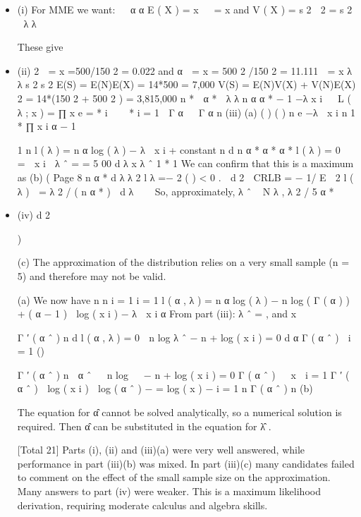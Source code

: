 \documentclass[a4paper,12pt]{article}
\begin{document}
\begin{itemize}
\item (i)
For MME we want:


α
α
E ( X ) = x   = x and V ( X ) = s 2  2 = s 2

λ
λ

These give
\item (ii)
2
 = x =500/150 2 = 0.022 and α
 = x = 500 2 /150 2 = 11.111
 = x λ
λ
s 2
s 2 
E(S) = E(N)E(X) = 14*500 = 7,000 
V(S) = E(N)V(X) + V(N)E(X) 2 = 14*(150 2 + 500 2 ) = 3,815,000 
n
*
 α *

λ
λ n α
α * − 1 −λ x i 

L ( λ ; x ) = ∏
x
e
=
* i

 
*
i = 1  Γ α

 Γ α
n
(iii)
(a)
( )
{ ( ) }
n
e
−λ  x i n
1
*
∏ x i α − 1

1
n
l ( λ ) = n α log ( λ ) − λ  x i + constant 
n
d
n α *
α * α *
l ( λ ) = 0 
=  x i  λ ˆ =
=
5 00
d λ
x
λ ˆ
1 
*
1
We can confirm that this is a maximum as
(b)
(
Page 8
n α *
d λ λ 2
l λ =−
2 ( )
< 0 .
 d 2

CRLB = − 1/ E  2 l ( λ )  = λ 2 / ( n α * )
 d λ



So, approximately, λ ˆ ~ N λ , λ 2 / 5 α *
\item (iv)
d 2


)

(c) The approximation of the distribution relies on a very small sample
(n = 5) and therefore may not be valid.

(a) We now have
n n
i = 1 i = 1
l ( α , λ ) = n α log ( λ ) − n log ( Γ ( α ) ) + ( α − 1 )  log ( x i ) − λ  x i 
α
From part (iii): λ ˆ = , and
x 

Γ ′ ( α ˆ ) n
d
l ( α , λ ) = 0  n log λ ˆ − n
+ log ( x i ) = 0
d α
Γ ( α ˆ ) 
i = 1
()

Γ ′ ( α ˆ ) n
 α ˆ 
 n log   − n
+ log ( x i ) = 0
Γ ( α ˆ ) 
 x 
i = 1
Γ ′ ( α ˆ )
 log ( x i )
 log ( α ˆ ) −
= log ( x ) − i = 1
n
Γ ( α ˆ )
n
(b)

The equation for α̂ cannot be solved analytically, so a numerical solution is required. Then α̂ can be substituted in the equation for λ̂ .

[Total 21]
Parts (i), (ii) and (iii)(a) were very well answered, while performance in part (iii)(b) was mixed. In part (iii)(c) many candidates failed to comment on the effect of the small sample size on the approximation. Many answers to
part (iv) were weaker. This is a maximum likelihood derivation, requiring moderate calculus and algebra skills.
\end{itemize}
\end{document}
